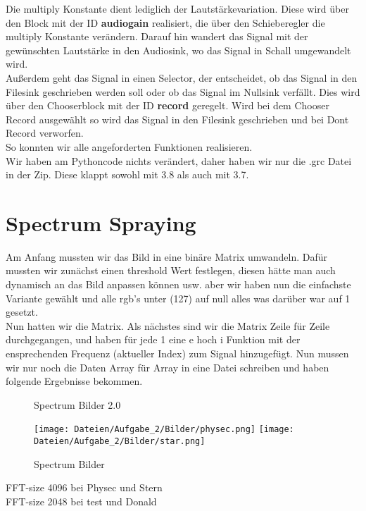 \documentclass[12pt,a4paper]{article}
\begin{document}
Die multiply Konstante dient lediglich der Lautstärkevariation. Diese wird über den Block mit der ID \textbf{audiogain} realisiert, die über den Schieberegler die multiply Konstante verändern. Darauf hin wandert das Signal mit der gewünschten Lautstärke in den Audiosink, wo das Signal in Schall umgewandelt wird. \\
Außerdem geht das Signal in einen Selector, der entscheidet, ob das Signal in den Filesink geschrieben werden soll oder ob das Signal im Nullsink verfällt. Dies wird über den Chooserblock mit der ID \textbf{record} geregelt. Wird bei dem Chooser Record ausgewählt so wird das Signal in den Filesink geschrieben und bei Dont Record verworfen. \\
So konnten wir alle angeforderten Funktionen realisieren.\\

Wir haben am Pythoncode nichts verändert, daher haben wir nur die .grc Datei in der Zip. Diese klappt sowohl mit 3.8 als auch mit 3.7.
\section{Spectrum Spraying}
Am Anfang mussten wir das Bild in eine binäre Matrix umwandeln. Dafür mussten wir zunächst einen threshold Wert festlegen, diesen hätte man auch dynamisch an das Bild anpassen können usw. aber wir haben nun die einfachste Variante gewählt und alle rgb's unter (127) auf null alles was darüber war auf 1 gesetzt. \\
Nun hatten wir die Matrix. Als nächstes sind wir die Matrix Zeile für Zeile durchgegangen, und haben für jede 1 eine e hoch i Funktion mit der ensprechenden Frequenz (aktueller Index) zum Signal hinzugefügt. Nun mussen wir nur noch die Daten Array für Array in eine Datei schreiben und haben folgende Ergebnisse bekommen. \\
\begin{figure}[H]
\centering
\qquad
{}
\caption{Spectrum Bilder 2.0}
\label{fig:2_2}
\end{figure}
\begin{figure}[H]
\centering
\texttt{[image: Dateien/Aufgabe\_2/Bilder/physec.png]} 
\texttt{[image: Dateien/Aufgabe\_2/Bilder/star.png]} 
\caption{Spectrum Bilder}
\label{fig:2_1}
\end{figure}
FFT-size 4096 bei Physec und Stern\\
FFT-size 2048 bei test und Donald\\
\end{document}
